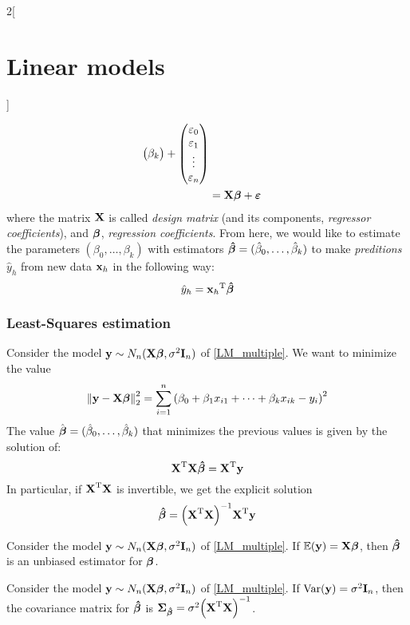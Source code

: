 \documentclass[../../../main_math.tex]{subfiles}
\begin{document}
\begin{multicols}{2}[\section{Linear models}]
\begin{definition}
\begin{align}
\begin{pmatrix}
                     \beta_k \\
                   \end{pmatrix}+
      \begin{pmatrix}
        \varepsilon_0 \\
        \varepsilon_1 \\
        \vdots        \\
        \varepsilon_n \\
      \end{pmatrix}                                                \\
      \label{LM_multiple}      & =\boldsymbol{\mathrm{X}}\boldsymbol{\mathrm{\beta}}+\boldsymbol{\mathrm{\varepsilon}}
    \end{align}
    where the matrix $\boldsymbol{\mathrm{X}}$ is called \emph{design matrix} (and its components, \emph{regressor coefficients}), and $\boldsymbol{\mathrm{\beta}}$, \emph{regression coefficients}. From here, we would like to estimate the parameters $(\beta_0,\ldots,\beta_k)$ with estimators $\boldsymbol{\mathrm{\hat\beta}}=(\hat\beta_0,\ldots,\hat\beta_k)$ to make \emph{preditions} $\hat{y}_h$ from new data $\boldsymbol{\mathrm{x}}_h$ in the following way: $$\hat{y}_h={\boldsymbol{\mathrm{x}}_h}^{\mathrm{T}}\boldsymbol{\mathrm{\hat\beta}}$$
  \end{definition}
  \subsubsection{Least-Squares estimation}
  \begin{proposition}
    Consider the model $\boldsymbol{\mathrm{y}}\sim N_n(\boldsymbol{\mathrm{X\beta}},\sigma^2\boldsymbol{\mathrm{I}}_n)$ of \cref{LM_multiple}. We want to minimize the value $${\left\|\boldsymbol{\mathrm{y}}-\boldsymbol{\mathrm{X\beta}}\right\|}_2^2=\sum_{i=1}^n{\left(\beta_0+\beta_1x_{i1}+\cdots+\beta_kx_{ik}-y_i\right)}^2$$
    The value $\hat{\boldsymbol{\mathrm{\beta}}}=(\hat\beta_0,\ldots,\hat\beta_k)$ that minimizes the previous values is given by the solution of: $${\boldsymbol{\mathrm{X}}}^{\mathrm{T}}\boldsymbol{\mathrm{X\hat\beta}}={\boldsymbol{\mathrm{X}}}^{\mathrm{T}}\boldsymbol{\mathrm{y}}$$
    In particular, if ${\boldsymbol{\mathrm{X}}}^{\mathrm{T}}\boldsymbol{\mathrm{X}}$ is invertible, we get the explicit solution $$\boldsymbol{\mathrm{\hat\beta}}={\left({\boldsymbol{\mathrm{X}}}^{\mathrm{T}}\boldsymbol{\mathrm{X}}\right)}^{-1}{\boldsymbol{\mathrm{X}}}^{\mathrm{T}}\boldsymbol{\mathrm{y}}$$
  \end{proposition}
  \begin{proposition}
    Consider the model $\boldsymbol{\mathrm{y}}\sim N_n(\boldsymbol{\mathrm{X\beta}},\sigma^2\boldsymbol{\mathrm{I}}_n)$ of \cref{LM_multiple}. If $\mathbb{E}(\boldsymbol{\mathrm{y}})=\boldsymbol{\mathrm{X\beta}}$, then $\boldsymbol{\mathrm{\hat\beta}}$ is an unbiased estimator for $\boldsymbol{\mathrm{\beta}}$.
  \end{proposition}
  \begin{proposition}
    Consider the model $\boldsymbol{\mathrm{y}}\sim N_n(\boldsymbol{\mathrm{X\beta}},\sigma^2\boldsymbol{\mathrm{I}}_n)$ of \cref{LM_multiple}. If $\mathrm{Var}(\boldsymbol{\mathrm{y}})=\sigma^2\boldsymbol{\mathrm{I}}_n$, then the covariance matrix for $\boldsymbol{\mathrm{\hat\beta}}$ is $\boldsymbol{\mathrm{\Sigma}}_{\boldsymbol{\mathrm{\hat\beta}}}=\sigma^2{\left({\boldsymbol{\mathrm{X}}}^{\mathrm{T}}\boldsymbol{\mathrm{X}}\right)}^{-1}$.
  \end{proposition}

\end{multicols}
\end{document}
